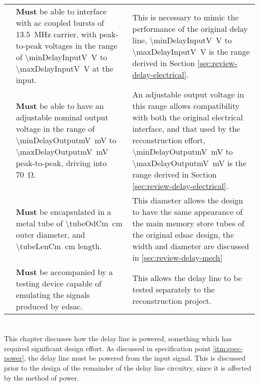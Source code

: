 \begin{longtable}{r  >{\raggedright}p{}  >{\raggedright}p{} }
	{specNo}\thespecNo\label{itm:spec-skew-input-v} & \textbf{Must} be able to interface with \gls{ac} coupled bursts of \SI{13.5}{\mega\hertz} carrier, with peak-to-peak voltages in the range of \SI{\minDelayInputV}{\volt} to \SI{\maxDelayInputV}{\volt} at the input. & This is necessary to mimic the performance of the original delay line, \SI{\minDelayInputV}{\volt} to \SI{\maxDelayInputV}{\volt} is the range derived in Section \ref{sec:review-delay-electrical}. \tabularnewline
	
	{specNo}\thespecNo\label{itm:spec-skew-output-v} & \textbf{Must} be able to have an adjustable nominal output voltage in the range of \SI{\minDelayOutputmV}{\milli\volt} to \SI{\maxDelayOutputmV}{\milli\volt} peak-to-peak, driving into \SI{70}{\ohm}. & An adjustable output voltage in this range allows compatibility with both the original electrical interface, and that used by the reconstruction effort, \SI{\minDelayOutputmV}{\milli\volt} to \SI{\maxDelayOutputmV}{\milli\volt} is the range derived in Section \ref{sec:review-delay-electrical}. \tabularnewline
	
	{specNo}\thespecNo\label{itm:spec-phys-size} & \textbf{Must} be encapsulated in a metal tube of \SI{\tubeOdCm}{\centi\metre} outer diameter, and \SI{\tubeLenCm}{\centi\metre} length. & This diameter allows the design to have the same appearance of the main memory store tubes of the original \gls{edsac} design, the width and diameter are discussed in \ref{sec:review-delay-mech} \tabularnewline
	
	{specNo}\thespecNo\label{itm:spec-testing} & \textbf{Must} be accompanied by a testing device capable of emulating the signals produced by \gls{edsac}. & This allows the delay line to be tested separately to the reconstruction project. \tabularnewline
	
	
\end{longtable}

\chapter{} \label{sec:power}

This chapter discusses how the delay line is powered, something which has required significant design effort. As discussed in specification point \ref{itm:spec-power}, the delay line must be powered from the input signal. This is discussed prior to the design of the remainder of the delay line circuitry, since it is affected by the method of power.

